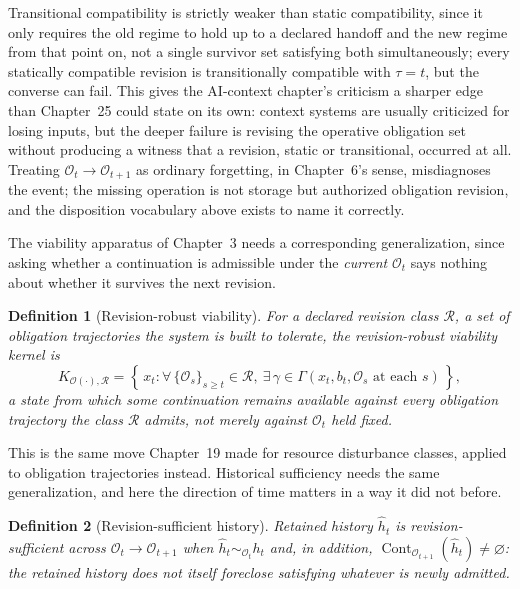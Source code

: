 \documentclass[11pt]{report}
\newtheorem{definition}{Definition}[chapter]
\begin{document}
Transitional compatibility is strictly weaker than static compatibility, since it only requires the old regime to hold up to a declared handoff and the new regime from that point on, not a single survivor set satisfying both simultaneously; every statically compatible revision is transitionally compatible with $\tau = t$, but the converse can fail. This gives the AI-context chapter's criticism a sharper edge than Chapter~25 could state on its own: context systems are usually criticized for losing inputs, but the deeper failure is revising the operative obligation set without producing a witness that a revision, static or transitional, occurred at all. Treating $\mathcal O_t \to \mathcal O_{t+1}$ as ordinary forgetting, in Chapter~6's sense, misdiagnoses the event; the missing operation is not storage but authorized obligation revision, and the disposition vocabulary above exists to name it correctly.

The viability apparatus of Chapter~3 needs a corresponding generalization, since asking whether a continuation is admissible under the \emph{current} $\mathcal O_t$ says nothing about whether it survives the next revision.

\begin{definition}[Revision-robust viability]
For a declared revision class $\mathcal R$, a set of obligation trajectories the system is built to tolerate, the revision-robust viability kernel is
\[
K_{\mathcal O(\cdot), \mathcal R} = \left\{\, x_t : \forall\, \{\mathcal O_s\}_{s \ge t} \in \mathcal R,\ \exists\, \gamma \in \Gamma(x_t, b_t, \mathcal O_s \text{ at each } s) \,\right\},
\]
a state from which some continuation remains available against every obligation trajectory the class $\mathcal R$ admits, not merely against $\mathcal O_t$ held fixed.
\end{definition}

This is the same move Chapter~19 made for resource disturbance classes, applied to obligation trajectories instead. Historical sufficiency needs the same generalization, and here the direction of time matters in a way it did not before.

\begin{definition}[Revision-sufficient history]
Retained history $\widehat h_t$ is revision-sufficient across $\mathcal O_t \to \mathcal O_{t+1}$ when $\widehat h_t \sim_{\mathcal O_t} h_t$ and, in addition, $\operatorname{Cont}_{\mathcal O_{t+1}}(\widehat h_t) \ne \varnothing$: the retained history does not itself foreclose satisfying whatever is newly admitted.
\end{definition}
\end{document}
